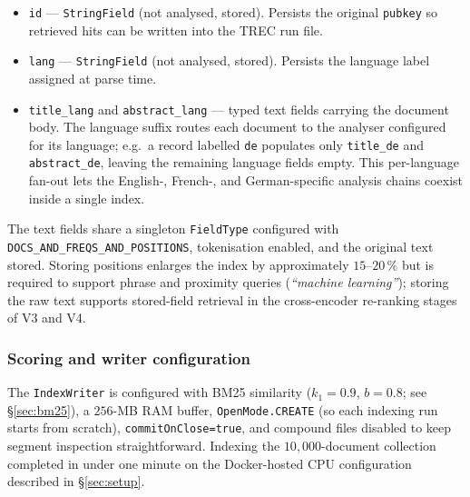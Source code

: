 \begin{itemize}
  \item \texttt{id} — \texttt{StringField} (not analysed, stored).
    Persists the original \texttt{pubkey} so retrieved hits can be
    written into the TREC run file.
  \item \texttt{lang} — \texttt{StringField} (not analysed, stored).
    Persists the language label assigned at parse time.
  \item \texttt{title\_\textlangle lang\textrangle} and
    \texttt{abstract\_\textlangle lang\textrangle} — typed text
    fields carrying the document body.  The language suffix routes
    each document to the analyser configured for its language; e.g.\
    a record labelled \texttt{de} populates only \texttt{title\_de}
    and \texttt{abstract\_de}, leaving the remaining language fields
    empty.  This per-language fan-out lets the English-, French-, and
    German-specific analysis chains coexist inside a single index.
\end{itemize}

The text fields share a singleton \texttt{FieldType} configured with
\texttt{DOCS\_AND\_FREQS\_AND\_POSITIONS}, tokenisation
enabled, and the original text stored.  Storing positions enlarges
the index by approximately $15\text{--}20\,\%$ but is required to
support phrase and proximity queries (\textit{``machine learning''});
storing the raw text supports stored-field retrieval in the
cross-encoder re-ranking stages of V3 and V4.

\subsubsection{Scoring and writer configuration}
The \texttt{IndexWriter} is configured with BM25 similarity
($k_1=0.9$, $b=0.8$; see \S\ref{sec:bm25}), a $256$-MB RAM buffer,
\texttt{OpenMode.CREATE} (so each indexing run starts from scratch),
\texttt{commitOnClose=true}, and compound files disabled to keep
segment inspection straightforward.  Indexing the $10{,}000$-document
collection completed in under one minute on the Docker-hosted CPU
configuration described in \S\ref{sec:setup}.

